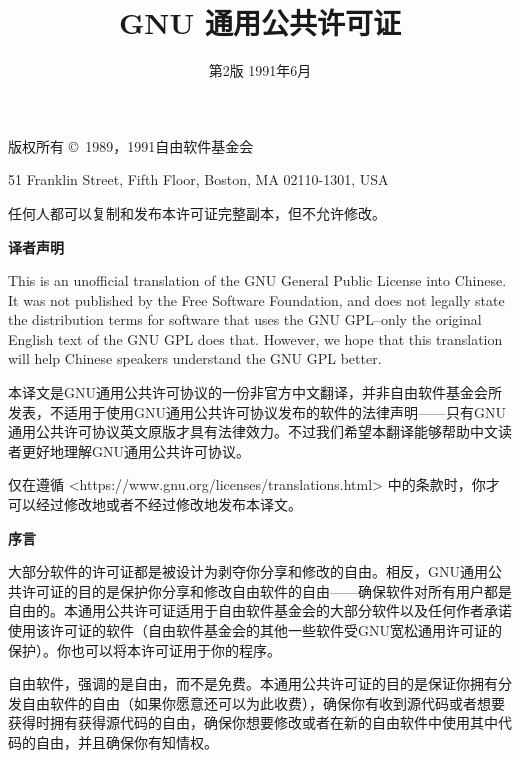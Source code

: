 \documentclass[11pt]{article}
\title{GNU 通用公共许可证}
\date{第2版 \space 1991年6月}
\begin{document}
\maketitle

\begin{center}
{\parindent 0in

版权所有 \copyright\ 1989，1991自由软件基金会

\bigskip

51 Franklin Street, Fifth Floor, Boston, MA  02110-1301, USA

\bigskip

任何人都可以复制和发布本许可证完整副本，但不允许修改。
}
\end{center}

\begin{center}
  {\bf\large 译者声明}
\end{center}

This is an unofficial translation of the GNU General Public License into Chinese. It was not published by the Free Software Foundation, and does not legally state the distribution terms for software that uses the GNU GPL--only the original English text of the GNU GPL does that. However, we hope that this translation will help Chinese speakers understand the GNU GPL better.

本译文是GNU通用公共许可协议的一份非官方中文翻译，并非自由软件基金会所发表，不适用于使用GNU通用公共许可协议发布的软件的法律声明——只有GNU通用公共许可协议英文原版才具有法律效力。不过我们希望本翻译能够帮助中文读者更好地理解GNU通用公共许可协议。

仅在遵循 <https://www.gnu.org/licenses/translations.html> 中的条款时，你才可以经过修改地或者不经过修改地发布本译文。

\pagebreak

\begin{center}
{\bf\large 序言}
\end{center}

大部分软件的许可证都是被设计为剥夺你分享和修改的自由。相反，GNU通用公共许可证的目的是保护你分享和修改自由软件的自由——确保软件对所有用户都是自由的。本通用公共许可证适用于自由软件基金会的大部分软件以及任何作者承诺使用该许可证的软件（自由软件基金会的其他一些软件受GNU宽松通用许可证的保护）。你也可以将本许可证用于你的程序。

自由软件，强调的是自由，而不是免费。本通用公共许可证的目的是保证你拥有分发自由软件的自由（如果你愿意还可以为此收费），确保你有收到源代码或者想要获得时拥有获得源代码的自由，确保你想要修改或者在新的自由软件中使用其中代码的自由，并且确保你有知情权。
\end{document}
